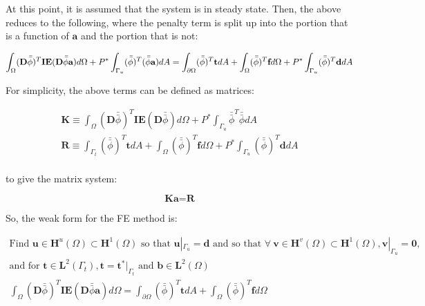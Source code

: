 \documentclass[10pt]{article}
\begin{document}
At this point, it is assumed that the system is in steady state. Then, the above reduces to the following, where the penalty term is split up into the portion that is a function of \(\textbf{a}\) and the portion that is not:

\begin{equation}
\int_{\Omega}(\textbf{D}\bar{\bar{\phi}})^T\textbf{IE}(\textbf{D}\bar{\bar{\phi}}\textbf{a})d\Omega +P^{*}\int_{\Gamma_u}(\bar{\bar{\phi}})^T(\bar{\bar{\phi}}\textbf{a})dA=\int_{\partial\Omega}(\bar{\bar{\phi}})^T\textbf{t}dA+\int_{\Omega}(\bar{\bar{\phi}})^T\textbf{f}d\Omega+P^{*}\int_{\Gamma_u}(\bar{\bar{\phi}})^T\textbf{d}dA\\
\end{equation}

For simplicity, the above terms can be defined as matrices:

\begin{equation}
\label{eq:FEWeakForm}
\begin{aligned}
\textbf{K}\equiv\int_{\Omega}(\textbf{D}\bar{\bar{\phi}})^T\textbf{IE}(\textbf{D}\bar{\bar{\phi}})d\Omega +P^{*}\int_{\Gamma_u}\bar{\bar{\phi}}^T\bar{\bar{\phi}}dA\\
\textbf{R}\equiv\int_{\Gamma_t}(\bar{\bar{\phi}})^T\textbf{t}dA+\int_{\Omega}(\bar{\bar{\phi}})^T\textbf{f}d\Omega+P^{*}\int_{\Gamma_u}(\bar{\bar{\phi}})^T\textbf{d}dA\\
\end{aligned}
\end{equation}

to give the matrix system:

\begin{equation}
\textbf{K}\textbf{a}=\textbf{R}
\end{equation}

So, the weak form for the FE method is:

\begin{tcolorbox}
\begin{equation}
\label{eq:FEWeakFormFinal}
\begin{aligned}
\text{Find }\textbf{u}\in \textbf{H}^u(\Omega)\subset \textbf{H}^1(\Omega) \text{ so that } \textbf{u}|_{\Gamma_u}=\textbf{d} \text{ and so that }\forall\ \textbf{v} \in \textbf{H}^v(\Omega)\subset \textbf{H}^1(\Omega), \textbf{v}|_{\Gamma_u}=\textbf{0},\\
\text{and for }\textbf{t}\in\textbf{L}^2(\Gamma_t), \textbf{t}=\textbf{t}^{*}|_{\Gamma_t}\text{ and }\textbf{b}\in\textbf{L}^2(\Omega)\\
\int_{\Omega}(\textbf{D}\bar{\bar{\phi}})^T\textbf{IE}(\textbf{D}\bar{\bar{\phi}}\textbf{a})d\Omega =\int_{\partial\Omega}(\bar{\bar{\phi}})^T\textbf{t}dA+\int_{\Omega}(\bar{\bar{\phi}})^T\textbf{f}d\Omega\\
\end{aligned}
\end{equation}
\end{tcolorbox}
\end{document}
